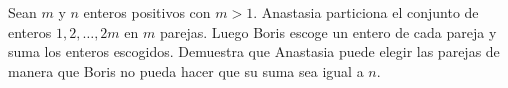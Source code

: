 Sean $m$ y $n$ enteros positivos con $m \gt 1$. Anastasia particiona el conjunto de enteros
$1, 2, \dots , 2m$ en $m$ parejas. Luego Boris escoge un entero de cada pareja y suma los enteros escogidos.
Demuestra que Anastasia puede elegir las parejas de manera que Boris no pueda hacer que su suma
sea igual a $n$.